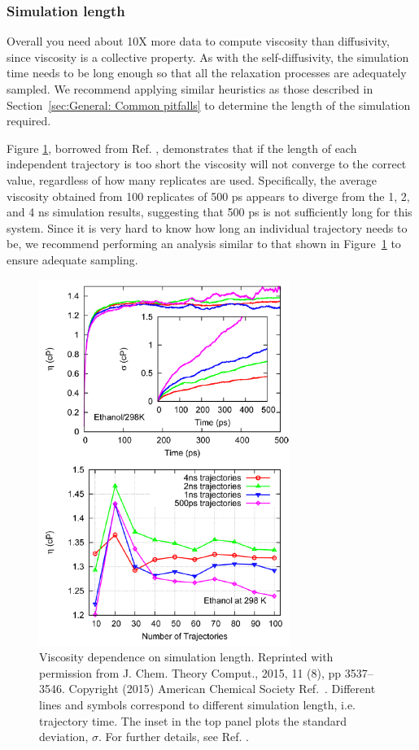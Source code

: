 \documentclass[9pt,bestpractices]{livecoms}
\begin{document}
\subsubsection{Simulation length} \label{sec:Viscosity:General: Simulation length}

Overall you need about 10X more data to compute viscosity than diffusivity, since viscosity is a collective property. As with the self-diffusivity, the simulation time needs to be long enough so that all the relaxation processes are adequately sampled. We recommend applying similar heuristics as those described in Section~\ref{sec:General: Common pitfalls} to determine the length of the simulation required.

Figure \ref{fig:ZhangFig8}, borrowed from Ref. \cite{Zhang2015}, demonstrates that if the length of each independent trajectory is too short the viscosity will not converge to the correct value, regardless of how many replicates are used. Specifically, the average viscosity obtained from 100 replicates of 500 ps appears to diverge from the 1, 2, and 4 ns simulation results, suggesting that 500 ps is not sufficiently long for this system. Since it is very hard to know how long an individual trajectory needs to be, we recommend performing an analysis similar to that shown in Figure~\ref{fig:ZhangFig8} to ensure adequate sampling.

\begin{figure}[htb!]
	\centering
	\includegraphics[width=3.2in]{ZhangFig8.png}
	\caption{Viscosity dependence on simulation length. Reprinted with permission from J. Chem. Theory Comput., 2015, 11 (8), pp 3537–3546. Copyright (2015) American Chemical Society Ref.\ \cite{Zhang2015}. Different lines and symbols correspond to different simulation length, i.e. trajectory time. The inset in the top panel plots the standard deviation, $\sigma$. For further details, see Ref. \cite{Zhang2015}.}
	\label{fig:ZhangFig8}
\end{figure}
\end{document}
